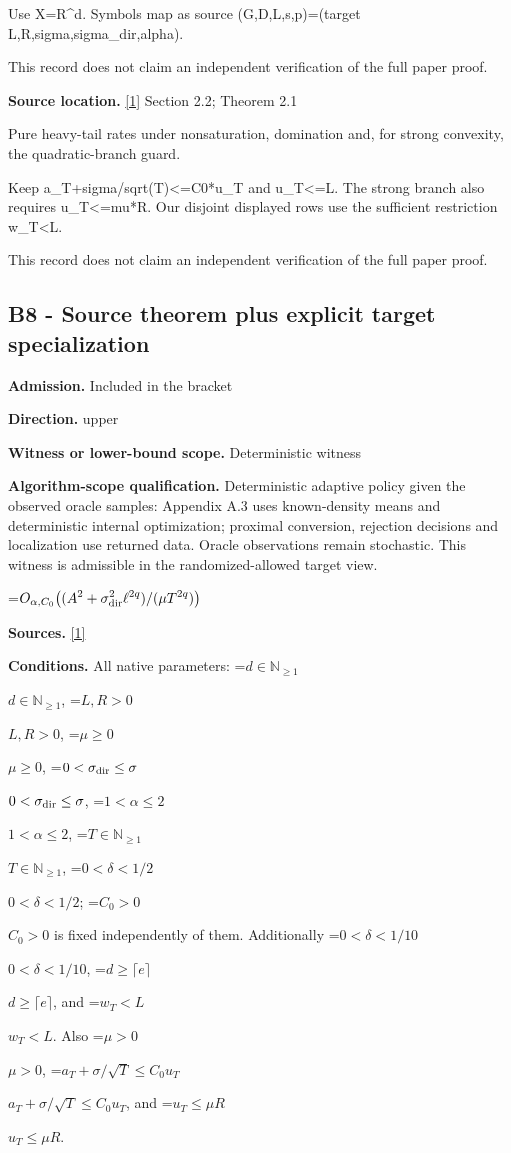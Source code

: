 \documentclass[10pt,a4paper]{article}
\newcommand{\AtlasMath}[1]{\par\begingroup\centering\setbox0=\hbox{$\displaystyle #1$}\ifdim\wd0>1.4\linewidth\typeout{ATLAS WIDE FORMULA: \the\wd0}\fi\ifdim\wd0>\linewidth\resizebox{\linewidth}{!}{\box0}\else\box0\fi\par\endgroup}
\newcommand{\AtlasInlineMath}[1]{\begingroup\setbox0=\hbox{$#1$}\ifdim\wd0>.4\linewidth\endgroup\AtlasMath{#1}\else\endgroup$#1$\fi}
\begin{document}
Use X=R\textasciicircum{}d. Symbols map as source (G,D,L,s,p)=(target L,R,sigma,sigma\_dir,alpha).



This record does not claim an independent verification of the full paper proof.



\textbf{Source location.} \href{https://arxiv.org/html/2610.00260v2}{[1]} Section 2.2; Theorem 2.1



Pure heavy-tail rates under nonsaturation, domination and, for strong convexity, the quadratic-branch guard.



Keep a\_T+sigma/sqrt(T)<=C0*u\_T and u\_T<=L. The strong branch also requires u\_T<=mu*R. Our disjoint displayed rows use the sufficient restriction w\_T<L.



This record does not claim an independent verification of the full paper proof.



\subsection{B8 - Source theorem plus explicit target specialization}


\textbf{Admission.} Included in the bracket



\textbf{Direction.} upper



\textbf{Witness or lower-bound scope.} Deterministic witness



\textbf{Algorithm-scope qualification.} Deterministic adaptive policy given the observed oracle samples: Appendix A.3 uses known-density means and deterministic internal optimization; proximal conversion, rejection decisions and localization use returned data. Oracle observations remain stochastic. This witness is admissible in the randomized-allowed target view.



\AtlasMath{O_{\alpha,C_0}\!\left((A^2+\sigma_{\rm dir}^2\ell^{2q})/(\mu T^{2q})\right)}


\textbf{Sources.} \href{https://arxiv.org/html/2610.00260v2}{[1]}



\textbf{Conditions.} All native parameters: \AtlasInlineMath{d\in\mathbb N_{\ge1}}, \AtlasInlineMath{L,R>0}, \AtlasInlineMath{\mu\ge0}, \AtlasInlineMath{0<\sigma_{\rm dir}\le\sigma}, \AtlasInlineMath{1<\alpha\le2}, \AtlasInlineMath{T\in\mathbb N_{\ge1}}, \AtlasInlineMath{0<\delta<1/2}; \AtlasInlineMath{C_0>0} is fixed independently of them. Additionally \AtlasInlineMath{0<\delta<1/10}, \AtlasInlineMath{d\ge\lceil e\rceil}, and \AtlasInlineMath{w_T<L}. Also \AtlasInlineMath{\mu>0}, \AtlasInlineMath{a_T+\sigma/\sqrt T\le C_0u_T}, and \AtlasInlineMath{u_T\le\mu R}.
\end{document}
